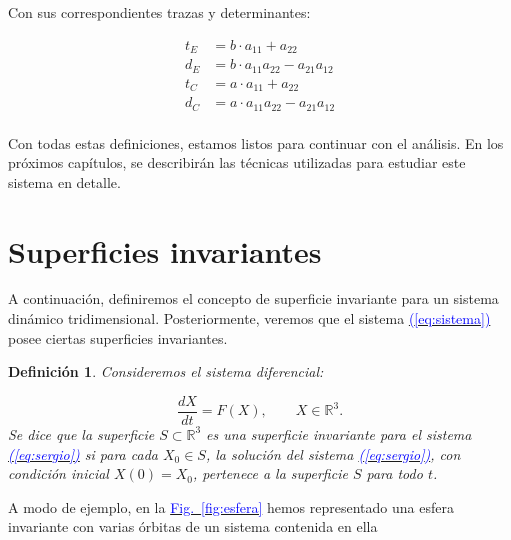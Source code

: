 \documentclass[12pt,a4paper]{report} %
\newtheorem{definicion}{Definición}[chapter]
\newtheorem{definicion}{Definición}[chapter] %
\newcommand{\fref}[1]{\hyperref[#1]{\textcolor{blue}{Fig.~\ref*{#1}}}}
\newcommand{\eref}[1]{\hyperref[#1]{\textcolor{blue}{(\ref*{#1})}}}
\newcommand{\fref}[1]{\hyperref[#1]{\textcolor{blue}{\textit{Fig.~\ref*{#1}}}}}
\newcommand{\eref}[1]{\hyperref[#1]{\textcolor{blue}{\textit{(\ref*{#1})}}}}
\begin{document}
    \noindent Con sus correspondientes trazas y determinantes:
    
    \begin{equation}
    \begin{aligned}
    	t_E &= b \cdot a_{11} + a_{22}\\
    	d_E &= b \cdot a_{11}a_{22} - a_{21}a_{12}\\
    	t_C &= a \cdot a_{11} + a_{22}\\
    	d_C &= a \cdot a_{11}a_{22} - a_{21}a_{12}\\
    \end{aligned}
    \end{equation}\smallskip
    
	\noindent Con todas estas definiciones, estamos listos para continuar con el análisis. En los próximos capítulos, se describirán las técnicas utilizadas para estudiar este sistema en detalle.
	
	\newpage
	
	\section{Superficies invariantes}
	\label{sec:2.4}
	
	\noindent A continuación, definiremos el concepto de superficie invariante para un sistema dinámico tridimensional. Posteriormente, veremos que el sistema \eref{eq:sistema} posee ciertas superficies invariantes.
	
	\begin{definicion}
		Consideremos el sistema diferencial:
		
		\begin{equation}
			\label{eq:sergio}
			\frac{dX}{dt}=F(X),\qquad X\in \mathbb{R}^3.
		\end{equation}\smallskip
		Se dice que la superficie $S\subset \mathbb{R}^3$ es una superficie invariante para el sistema \eref{eq:sergio} si para cada $X_0 \in S$, la solución del sistema \eref{eq:sergio}, con condición inicial $X(0)=X_0$, pertenece a la superficie $S$ para todo $t$.
	\end{definicion}\smallskip
	
	\vspace{0.5cm}A modo de ejemplo, en la \fref{fig:esfera} hemos representado una esfera invariante con varias órbitas de un sistema contenida en ella
	
\end{document}
